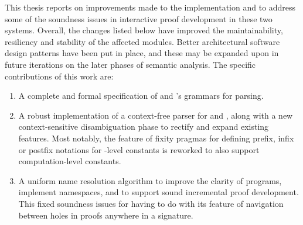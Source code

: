 This thesis reports on improvements made to the implementation \Beluga and \Harpoon to address some of the soundness issues in interactive proof development in these two systems.
Overall, the changes listed below have improved the maintainability, resiliency and stability of the affected modules.
Better architectural software design patterns have been put in place, and these may be expanded upon in future iterations on the later phases of semantic analysis.
The specific contributions of this work are:
\begin{enumerate}
\item
A complete and formal specification of \Beluga and \Harpoon's grammars for parsing.
\item
A robust implementation of a context-free parser for \Beluga and \Harpoon, along with a new context-sensitive disambiguation phase to rectify and expand existing features.
Most notably, the \Beluga feature of fixity pragmas for defining prefix, infix or postfix notations for \LF-level constants is reworked to also support computation-level constants.
\item
A uniform name resolution algorithm to improve the clarity of \Beluga programs, implement namespaces, and to support sound incremental proof development.
This fixed soundness issues for \Harpoon having to do with its feature of navigation between holes in proofs anywhere in a \Beluga signature.
\end{enumerate}
